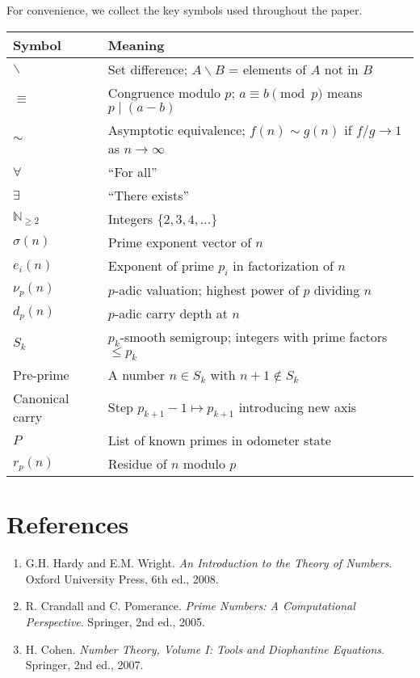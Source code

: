 \documentclass[11pt]{article}
\theoremstyle{definition}
\begin{document}
For convenience, we collect the key symbols used throughout the paper.

\begin{center}
\begin{tabular}{ll}
\toprule
Symbol & Meaning \\
\midrule
$\backslash$ & Set difference; $A \backslash B$ = elements of $A$ not in $B$ \\
$\equiv$ & Congruence modulo $p$; $a \equiv b \pmod{p}$ means $p \mid (a-b)$ \\
$\sim$ & Asymptotic equivalence; $f(n) \sim g(n)$ if $f/g \to 1$ as $n \to \infty$ \\
$\forall$ & ``For all'' \\
$\exists$ & ``There exists'' \\
$\mathbb{N}_{\geq 2}$ & Integers $\{2,3,4,\dots\}$ \\
$\sigma(n)$ & Prime exponent vector of $n$ \\
$e_i(n)$ & Exponent of prime $p_i$ in factorization of $n$ \\
$\nu_p(n)$ & $p$-adic valuation; highest power of $p$ dividing $n$ \\
$d_p(n)$ & $p$-adic carry depth at $n$ \\
$S_k$ & $p_k$-smooth semigroup; integers with prime factors $\leq p_k$ \\
Pre-prime & A number $n \in S_k$ with $n+1 \notin S_k$ \\
Canonical carry & Step $p_{k+1}-1 \mapsto p_{k+1}$ introducing new axis \\
$P$ & List of known primes in odometer state \\
$r_p(n)$ & Residue of $n$ modulo $p$ \\
\bottomrule
\end{tabular}
\end{center}

\section*{References}

\begin{enumerate}
  \item G.H. Hardy and E.M. Wright. \emph{An Introduction to the Theory of Numbers}.  
        Oxford University Press, 6th ed., 2008.
  \item R. Crandall and C. Pomerance. \emph{Prime Numbers: A Computational Perspective}.  
        Springer, 2nd ed., 2005.
  \item H. Cohen. \emph{Number Theory, Volume I: Tools and Diophantine Equations}.  
        Springer, 2nd ed., 2007.
\end{enumerate}
\end{document}
